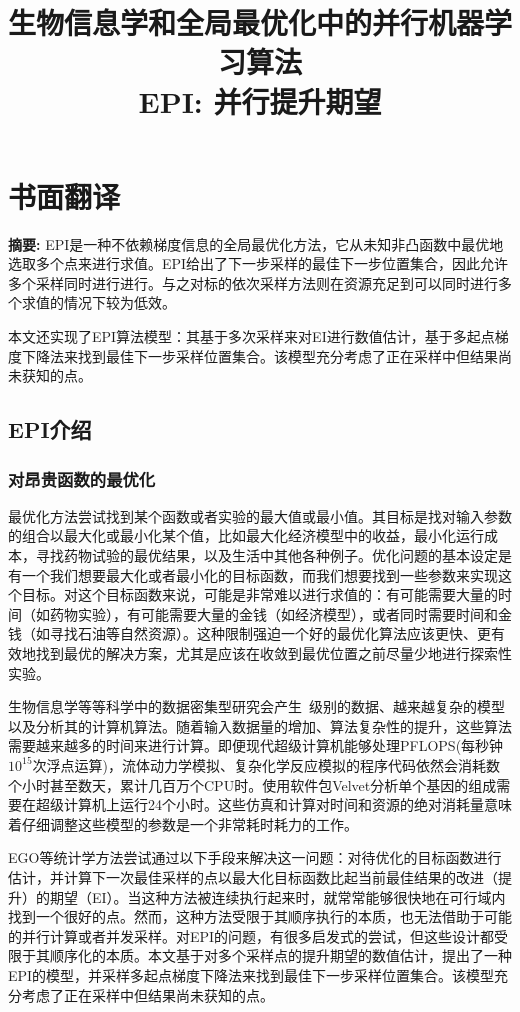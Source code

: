 \documentclass[index]{subfiles}
\begin{document}
\chapter{书面翻译}

\title{生物信息学和全局最优化中的并行机器学习算法 \\ EPI: 并行提升期望}

\textbf{摘要:}
EPI是一种不依赖梯度信息的全局最优化方法，它从未知非凸函数中最优地选取多个点来进行求值。EPI给出了下一步采样的最佳下一步位置集合，因此允许多个采样同时进行进行。与之对标的依次采样方法则在资源充足到可以同时进行多个求值的情况下较为低效。

本文还实现了EPI算法模型：其基于多次采样来对EI进行数值估计，基于多起点梯度下降法来找到最佳下一步采样位置集合。该模型充分考虑了正在采样中但结果尚未获知的点。

\section{EPI介绍} %
\label{cha:EPI Introduction}

\subsection{对昂贵函数的最优化}
最优化方法尝试找到某个函数或者实验的最大值或最小值。其目标是找对输入参数的组合以最大化或最小化某个值，比如最大化经济模型中的收益，最小化运行成本，寻找药物试验的最优结果，以及生活中其他各种例子。优化问题的基本设定是有一个我们想要最大化或者最小化的目标函数，而我们想要找到一些参数来实现这个目标。对这个目标函数来说，可能是非常难以进行求值的：有可能需要大量的时间（如药物实验），有可能需要大量的金钱（如经济模型），或者同时需要时间和金钱（如寻找石油等自然资源）。这种限制强迫一个好的最优化算法应该更快、更有效地找到最优的解决方案，尤其是应该在收敛到最优位置之前尽量少地进行探索性实验。

生物信息学等等科学中的数据密集型研究会产生\si{\peta\byte}级别的数据、越来越复杂的模型以及分析其的计算机算法。随着输入数据量的增加、算法复杂性的提升，这些算法需要越来越多的时间来进行计算。即便现代超级计算机能够处理\si{\peta FLOPS}(每秒钟$10^{15}$次浮点运算)，流体动力学模拟\cite{Compo2011}、复杂化学反应模拟\cite{Valiev2010}的程序代码依然会消耗数个小时甚至数天，累计几百万个CPU时。使用软件包Velvet\cite{Zerbino2008}分析单个基因的组成需要在超级计算机上运行24个小时。这些仿真和计算对时间和资源的绝对消耗量意味着仔细调整这些模型的参数是一个非常耗时耗力的工作。

EGO\cite{Jsons1998}等统计学方法尝试通过以下手段来解决这一问题：对待优化的目标函数进行估计，并计算下一次最佳采样的点以最大化目标函数比起当前最佳结果的改进（提升）的期望（EI）。当这种方法被连续执行起来时，就常常能够很快地在可行域内找到一个很好的点。然而，这种方法受限于其顺序执行的本质，也无法借助于可能的并行计算或者并发采样。对EPI的问题，有很多启发式的尝试\cite{Ginsbourger2008}，但这些设计都受限于其顺序化的本质。本文基于对多个采样点的提升期望的数值估计，提出了一种EPI的模型，并采样多起点梯度下降法来找到最佳下一步采样位置集合。该模型充分考虑了正在采样中但结果尚未获知的点。
\end{document}
